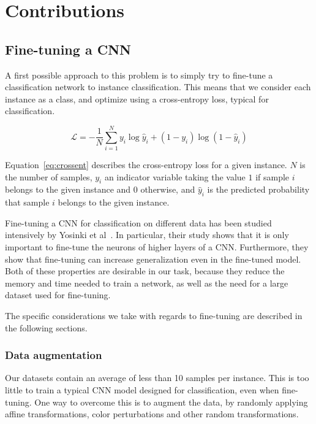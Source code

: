 
\chapter{Contributions}
\section{Fine-tuning a CNN}
A first possible approach to this problem is to simply try to fine-tune
a classification network to instance classification. This means that
we consider each instance as a class, and optimize using a cross-entropy
loss, typical for classification.

\begin{equation}\label{eq:crossent}
\mathcal{L} = - \frac{1}{N}
\sum_{i=1}^N y_i \log \hat{y}_i + (1-y_i) \log (1-\hat{y}_i)
\end{equation}

Equation~\ref{eq:crossent} describes the cross-entropy loss for a
given instance. $N$ is the number of samples, $y_i$ an indicator
variable taking the value $1$ if sample $i$ belongs to the given
instance and $0$ otherwise, and $\hat{y}_i$ is the predicted probability
that sample $i$ belongs to the given instance.

Fine-tuning a CNN for classification on different data has been studied
intensively by Yosinki et al~\cite{yosinski_how_2014}. In particular,
their study shows that it is only important to fine-tune the neurons
of higher layers of a CNN. Furthermore, they show that
fine-tuning can increase generalization even in the fine-tuned model.
Both of these properties are desirable in our task, because they reduce
the memory and time needed to train a network, as well as the need
for a large dataset used for fine-tuning.

The specific considerations we take with regards to fine-tuning are
described in the following sections.

\subsection{Data augmentation}
Our datasets %
contain an average of less than 10 samples per instance. This is too little
to train a typical CNN model designed for classification, even when
fine-tuning.
One way to overcome this is to augment the data, by randomly applying
affine transformations, color perturbations and other random transformations.

